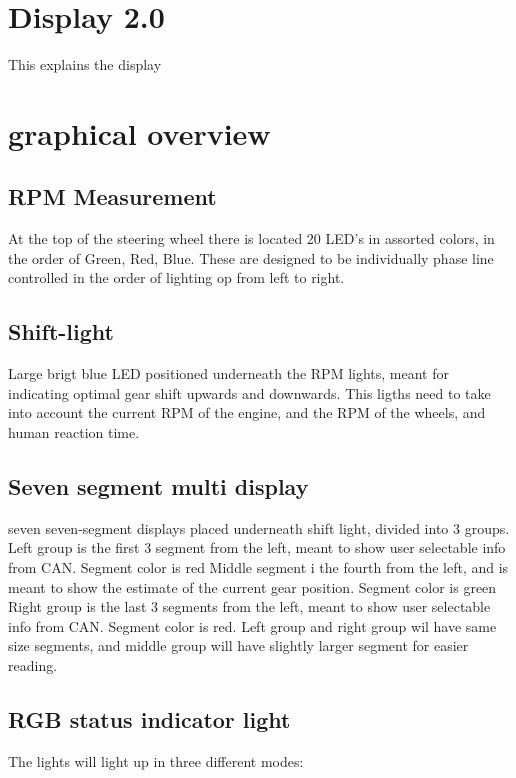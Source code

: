 \section{Display 2.0}
This explains the display


\section{graphical overview}
\subsection*{RPM Measurement}
At the top of the steering wheel there is located 20 LED's in assorted colors, in the order of Green, Red, Blue. These are designed to be individually phase line controlled in the order of lighting op from left to right.

\subsection*{Shift-light}
Large brigt blue LED positioned underneath the RPM lights, meant for indicating optimal gear shift upwards and downwards. This ligths need to take into account the current RPM of the engine, and the RPM of the wheels, and human reaction time.

\subsection*{Seven segment multi display}
seven seven-segment displays placed underneath shift light, divided into 3 groups.\newline
Left group is the first 3 segment from the left, meant to show user selectable info from CAN. Segment color is red\newline
Middle segment i the fourth from the left, and is meant to show the estimate of the current gear position. Segment color is green\newline
Right group is the last 3 segments from the left, meant to show user selectable info from CAN. Segment color is red.\newline
Left group and right group wil have same size segments, and middle group will have slightly larger segment for easier reading.

\subsection*{RGB status indicator light}
The lights will light up in three different modes:

